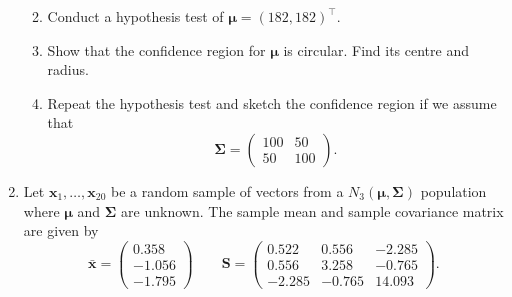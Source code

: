 \documentclass[
]{book}
\providecommand{\tightlist}{%
  \setlength{\itemsep}{0pt}\setlength{\parskip}{0pt}}
\theoremstyle{definition}
\theoremstyle{definition}
\theoremstyle{definition}
\theoremstyle{definition}
\theoremstyle{remark}
\begin{document}
\begin{enumerate}
  \begin{enumerate}
  \def\labelenumii{\roman{enumii}.}
  \tightlist
  \item
    Conduct a hypothesis test of \({\boldsymbol{\mu}}= (182,182)^\top\).
  \item
    Show that the confidence region for \({\boldsymbol{\mu}}\) is circular. Find its centre and radius.
  \item
    Repeat the hypothesis test and sketch the confidence region if we assume that
    \[\boldsymbol{\Sigma}= \begin{pmatrix} 100 & 50 \\ 50 & 100 \end{pmatrix}.\]
  \end{enumerate}
\item
  Let \(\mathbf x_1, \ldots, \mathbf x_{20}\) be a random sample of vectors from a \(N_3({\boldsymbol{\mu}},\boldsymbol{\Sigma})\) population where \({\boldsymbol{\mu}}\) and \(\boldsymbol{\Sigma}\) are unknown. The sample mean and sample covariance matrix are given by
  \[\bar{\mathbf x} = \begin{pmatrix} 0.358 \\ -1.056 \\ -1.795 \end{pmatrix} \qquad
  \mathbf S= \begin{pmatrix} 0.522 & 0.556 & -2.285 \\ 0.556 & 3.258 & -0.765 \\ -2.285 & -0.765 & 14.093 \end{pmatrix}.\]


\end{enumerate}
\end{document}
